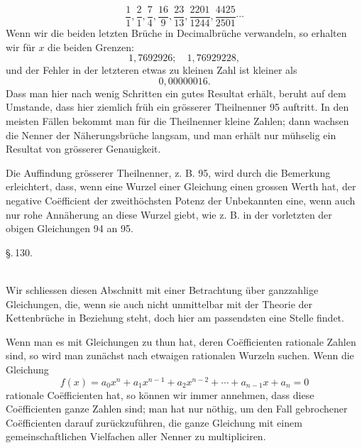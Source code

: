 \[
\frac{1}{1}, \frac{2}{1}, \frac{7}{4}, \frac{16}{9}, \frac{23}{13}, \frac{2201}{1244}, \frac{4425}{2501} \cdots
\]
Wenn wir die beiden letzten Brüche in Decimalbrüche verwandeln, so erhalten wir für $x$ die beiden Grenzen:
\[
1{,}7692926; \quad 1{,}76929228,
\]
und der Fehler in der letzteren etwas zu kleinen Zahl ist kleiner als
\[
0{,}00000016.
\]
Dass man hier nach wenig Schritten ein gutes Resultat erhält, beruht auf dem Umstande, dass hier ziemlich früh ein grösserer Theilnenner 95 auftritt. In den meisten Fällen bekommt man für die Theilnenner kleine Zahlen; dann wachsen die Nenner der Näherungsbrüche langsam, und man erhält nur mühselig ein Resultat von grösserer Genauigkeit.

Die Auffindung grösserer Theilnenner, z. B. 95, wird durch die Bemerkung erleichtert, dass, wenn eine Wurzel einer Gleichung einen grossen Werth hat, der negative Co\"efficient der zweithöchsten Potenz der Unbekannten eine, wenn auch nur rohe Annäherung an diese Wurzel giebt, wie z. B. in der vorletzten der obigen Gleichungen 94 an 95.

\begin{center}
\S.\,130.\\[0.3em]
\\
\end{center}

Wir schliessen diesen Abschnitt mit einer Betrachtung über ganzzahlige Gleichungen, die, wenn sie auch nicht unmittelbar mit der Theorie der Kettenbrüche in Beziehung steht, doch hier am passendsten eine Stelle findet.

Wenn man es mit Gleichungen zu thun hat, deren Co\"efficienten rationale Zahlen sind, so wird man zunächst nach etwaigen rationalen Wurzeln suchen. Wenn die Gleichung
\[
f(x) = a_0 x^n + a_1 x^{n-1} + a_2 x^{n-2} + \cdots + a_{n-1} x + a_n = 0
\]
rationale Co\"efficienten hat, so können wir immer annehmen, dass diese Co\"efficienten ganze Zahlen sind; man hat nur n\"othig, um den Fall gebrochener Co\"efficienten darauf zurückzuführen, die ganze Gleichung mit einem gemeinschaftlichen Vielfachen aller Nenner zu multipliciren.
